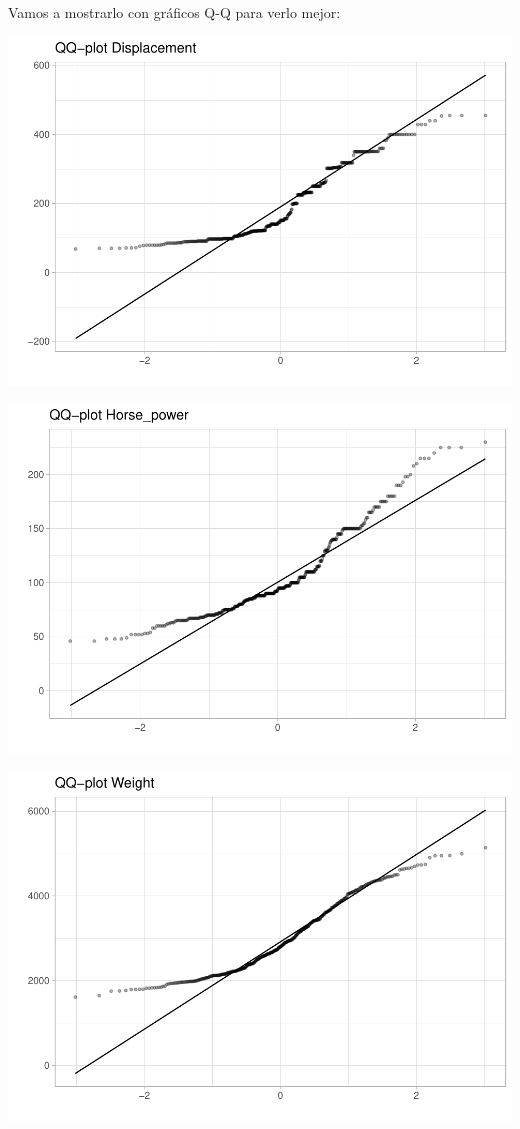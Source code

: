 Vamos a mostrarlo con gráficos Q-Q para verlo mejor:

\begin{center}\includegraphics{img/EDA_files/figure-latex/unnamed-chunk-14-1} \end{center}

\begin{center}\includegraphics{img/EDA_files/figure-latex/unnamed-chunk-14-2} \end{center}

\begin{center}\includegraphics{img/EDA_files/figure-latex/unnamed-chunk-14-3} \end{center}

